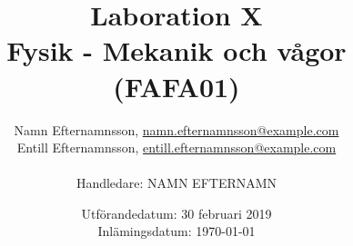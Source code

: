 \title{Laboration X \\ Fysik - Mekanik och vågor (FAFA01)}
\author{Namn Efternamnsson, \href{mailto:namn.efternamnsson@example.com}{namn.efternamnsson@example.com}  \\
Entill Efternamnsson, \href{mailto:entill.efternamnsson@example.com}{entill.efternamnsson@example.com} \\ \\ Handledare: NAMN EFTERNAMN}
\date{Utförandedatum: 30 februari 2019 \\ Inlämingsdatum: \today}	
